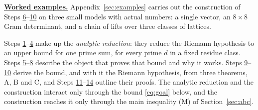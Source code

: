 \documentclass[11pt]{amsart}
\numberwithin{equation}{section}
\theoremstyle{definition}
\theoremstyle{remark}
\begin{document}
\medskip
\noindent\hyperref[sec:examples]{\textbf{Worked examples.}} Appendix~\ref{sec:examples} carries out the construction of Steps \hyperref[step:6]{6}--\hyperref[step:10]{10} on three small models with actual numbers: a single vector, an $8\times8$ Gram determinant, and a chain of lifts over three classes of lattices.

\medskip
Steps \hyperref[step:1]{1}--\hyperref[step:4]{4} make up the \emph{analytic reduction}: they reduce the Riemann hypothesis to an upper bound for one prime sum, for every prime $d$ in a fixed residue class. Steps \hyperref[step:5]{5}--\hyperref[step:8]{8} describe the object that proves that bound and why it works. Steps \hyperref[step:9]{9}--\hyperref[step:10]{10} derive the bound, and with it the Riemann hypothesis, from three theorems, A, B and C, and Steps \hyperref[step:11]{11}--\hyperref[step:14]{14} outline their proofs. The analytic reduction and the construction interact only through the bound \eqref{eq:goal} below, and the construction reaches it only through the main inequality (M) of Section~\ref{sec:abc}.
\end{document}
